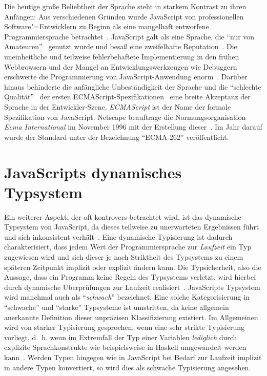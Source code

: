 Die heutige große Beliebtheit der Sprache steht in starkem Kontrast zu ihren Anfängen: Aus verschiedenen Gründen wurde JavaScript von professionellen Software"=Entwicklern zu Beginn als eine mangelhaft entworfene Programmiersprache betrachtet~\autocite{CROCKFORD:JS_POPULAR}. JavaScript galt als eine Sprache, die \enquote{nur von Amateuren}~\autocite{CROCKFORD:JS_MISUNDERSTOOD} genutzt wurde und besaß eine zweifelhafte Reputation~\autocite{THIEMANN:2005,THOMAS:2007}. Die uneinheitliche und teilweise fehlerbehaftete Implementierung in den frühen Webbrowsern und der Mangel an Entwicklungswerkzeugen wie Debuggern erschwerte die Programmierung von JavaScript-Anwendung enorm~\autocite{OREILLY:JS_HOW_DID_WE_GET_THERE}. Darüber hinaus behinderte die anfängliche Unbeständigkeit der Sprache und die \enquote{schlechte Qualität}~\autocite{CROCKFORD:JS_MISUNDERSTOOD} der ersten ECMAScript-Spezifikationen~\autocite{ECMASCRIPT:1997} eine breite Akzeptanz der Sprache in der Entwickler-Szene. \textit{ECMAScript} ist der Name der formale Spezifikation von JavaScript. Netscape beauftrage die Normungsorganisation \textit{Ecma International} im November 1996 mit der Erstellung dieser~\autocite{ECMASCRIPT:1997}. Im Jahr darauf wurde der Standard unter der Bezeichnung \enquote{ECMA-262} veröffentlicht.

\section{JavaScripts dynamisches Typsystem}

Ein weiterer Aspekt, der oft kontrovers betrachtet wird, ist das dynamische Typsystem von JavaScript, da dieses teilweise zu unerwarteten Ergebnissen führt und sich inkonsistent verhält~\autocite{PRADEL:2015,RICHARDS:2010}. Eine dynamische Typisierung ist dadurch charakterisiert, dass jedem Wert der Programmiersprache zur \emph{Laufzeit} ein Typ zugewiesen wird und sich dieser je nach Striktheit des Typsystems zu einem späteren Zeitpunkt implizit oder explizit ändern kann. Die Typsicherheit, also die Aussage, dass ein Programm keine Regeln des Typsystems verletzt, wird hierbei durch dynamische Überprüfungen zur Laufzeit realisiert~\autocite[37]{CARDELLI:TYPE_SYSTEMS}.
JavaScripts Typsystem wird manchmal auch als \enquote{\emph{schwach}} bezeichnet. Eine solche Kategorisierung in \enquote{schwache} und \enquote{starke} Typsysteme ist umstritten, da keine allgemein anerkannte Definition dieser unpräzisen Klassifizierung existiert. Im Allgemeinen wird von starker Typisierung gesprochen, wenn eine sehr strikte Typisierung vorliegt, d.~h. wenn im Extremfall der Typ einer Variablen \emph{lediglich} durch explizite Sprachkonstrukte wie beispielsweise in Haskell umgewandelt werden kann~\autocite{HASKELL}. Werden Typen hingegen wie in JavaScript bei Bedarf zur Laufzeit implizit in andere Typen konvertiert, so wird dies als schwache Typisierung angesehen.

